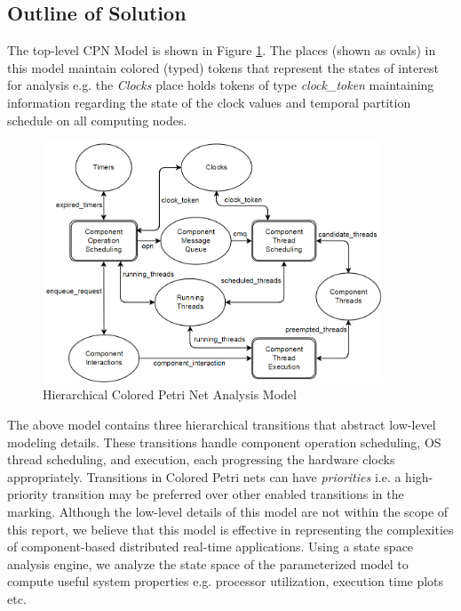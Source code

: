 \subsection{Outline of Solution}

The top-level CPN Model is shown in Figure \ref{fig:hlcpn}. The places (shown as ovals) in this model maintain colored (typed) tokens that represent the states of interest for analysis e.g. the \emph{Clocks} place holds tokens of type \emph{clock\_token} maintaining information regarding the state of the clock values and temporal partition schedule on all computing nodes. 

\begin{figure}[h]
	\centering
	\includegraphics[width=0.9\textwidth]{./figs/HL_CPN}
	\caption{Hierarchical Colored Petri Net Analysis Model}
	\label{fig:hlcpn}
\end{figure}

The above model contains three hierarchical transitions that abstract low-level modeling details. These transitions handle component operation scheduling, OS thread scheduling, and execution, each progressing the hardware clocks appropriately. Transitions in Colored Petri nets can have \emph{priorities} i.e. a high-priority transition may be preferred over other enabled transitions in the marking. Although the low-level details of this model are not within the scope of this report, we believe that this model is effective in representing the complexities of component-based distributed real-time applications. Using a state space analysis engine, we analyze the state space of the parameterized model to compute useful system properties e.g. processor utilization, execution time plots etc. 

